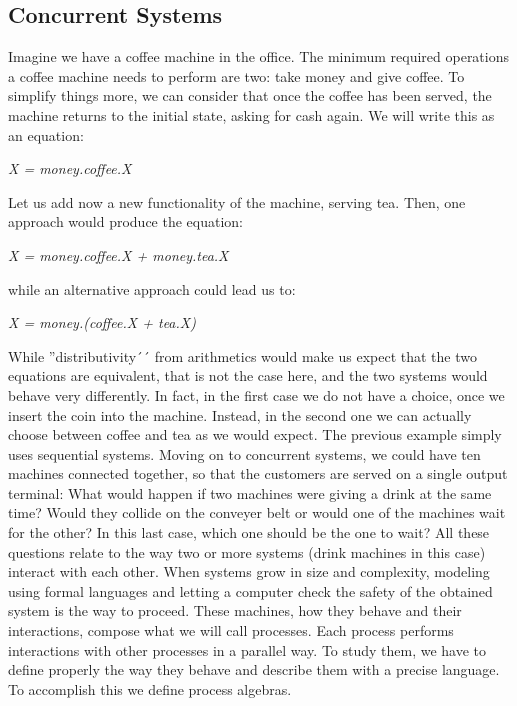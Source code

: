 \documentclass[11pt]{article}
\theoremstyle{definition}
\theoremstyle{plain}
\theoremstyle{definition}
\begin{document}
\subsection{Concurrent Systems}
Imagine we have a coffee machine in the office. The minimum required operations a coffee machine needs to perform are two: take money and give coffee. To simplify things more, we can consider that once the coffee has been served, the machine returns to the initial state, asking for cash again. We will write this as an equation:
\begin{center}
	\emph{X = money.coffee.X}
\end{center}
Let us add now a new functionality of the machine, serving tea. Then, one approach would produce the equation:
\begin{center}
	\emph{X = money.coffee.X + money.tea.X}
\end{center}
while an alternative approach could lead us to:
\begin{center}
	\emph{X = money.(coffee.X + tea.X)}
\end{center}
While ''distributivity´´ from arithmetics would make us expect that the two equations are equivalent, that is not the case here, and the two systems would behave very differently. In fact, in the first case we do not have a choice, once we insert the coin into the machine. Instead, in the second one we can actually choose between coffee and tea as we would expect.
The previous example simply uses sequential systems. Moving on to concurrent systems, we could have ten machines connected together, so that the customers are served on a single output terminal: What would happen if two machines were giving a drink at the same time? Would they collide on the conveyer belt or would one of the machines wait for the other? In this last case, which one should be the one to wait? All these questions relate to the way two or more systems (drink machines in this case) interact with each other. When systems grow in size and complexity, modeling using formal languages and letting a computer check the safety of the obtained system is the way to proceed.
These machines, how they behave and their interactions, compose what we will call processes. Each process performs interactions with other processes in a parallel way. To study them, we have to define properly the way they behave and describe them with a precise language. To accomplish this we define process algebras.



\clearpage
\end{document}
